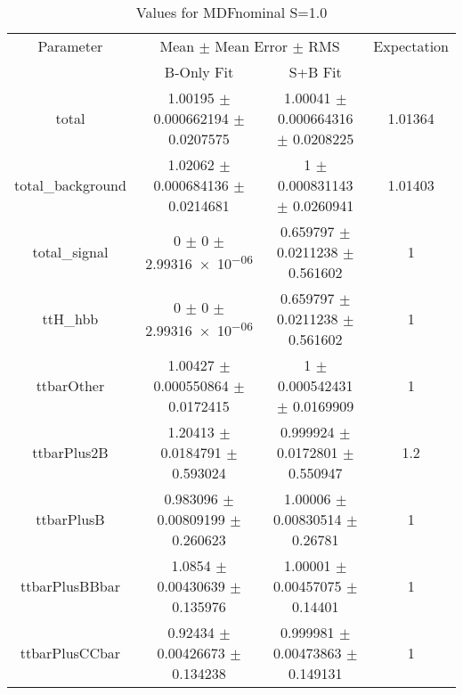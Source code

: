 \begin{table}
\centering
\caption{Values for MDFnominal S=1.0}
\begin{tabular}{cccc}
\toprule
Parameter & \multicolumn{2}{c}{Mean $\pm$ Mean Error $\pm$ RMS} & Expectation\\
 & B-Only Fit & S+B Fit & \\
\midrule
total & \num{1.00195} $\pm$ \num{0.000662194} $\pm$ \num{0.0207575} & \num{1.00041} $\pm$ \num{0.000664316} $\pm$ \num{0.0208225} & \num{1.01364}\\
total\_background & \num{1.02062} $\pm$ \num{0.000684136} $\pm$ \num{0.0214681} & \num{1} $\pm$ \num{0.000831143} $\pm$ \num{0.0260941} & \num{1.01403}\\
total\_signal & \num{0} $\pm$ \num{0} $\pm$ \num{2.99316e-06} & \num{0.659797} $\pm$ \num{0.0211238} $\pm$ \num{0.561602} & \num{1}\\
ttH\_hbb & \num{0} $\pm$ \num{0} $\pm$ \num{2.99316e-06} & \num{0.659797} $\pm$ \num{0.0211238} $\pm$ \num{0.561602} & \num{1}\\
ttbarOther & \num{1.00427} $\pm$ \num{0.000550864} $\pm$ \num{0.0172415} & \num{1} $\pm$ \num{0.000542431} $\pm$ \num{0.0169909} & \num{1}\\
ttbarPlus2B & \num{1.20413} $\pm$ \num{0.0184791} $\pm$ \num{0.593024} & \num{0.999924} $\pm$ \num{0.0172801} $\pm$ \num{0.550947} & \num{1.2}\\
ttbarPlusB & \num{0.983096} $\pm$ \num{0.00809199} $\pm$ \num{0.260623} & \num{1.00006} $\pm$ \num{0.00830514} $\pm$ \num{0.26781} & \num{1}\\
ttbarPlusBBbar & \num{1.0854} $\pm$ \num{0.00430639} $\pm$ \num{0.135976} & \num{1.00001} $\pm$ \num{0.00457075} $\pm$ \num{0.14401} & \num{1}\\
ttbarPlusCCbar & \num{0.92434} $\pm$ \num{0.00426673} $\pm$ \num{0.134238} & \num{0.999981} $\pm$ \num{0.00473863} $\pm$ \num{0.149131} & \num{1}\\
\bottomrule
\end{tabular}
\end{table}